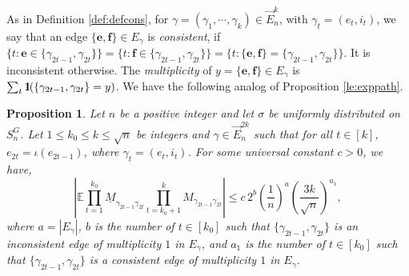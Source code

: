 \documentclass[11pt]{article}
\newtheorem{proposition}[lemma]{Proposition}
\newtheorem{definition}[lemma]{Definition}
\newcommand{\dE}{\mathbb {E}}
\newcommand{\cE}{E}
\newcommand{\ABS}[1]{{{\left| #1 \right|}}} %
\newcommand{\PAR}[1]{{{\left(#1\right)}}} %
\newcommand{\1}{1\!\!{\sf I}}\newcommand{\IND}{\1}
\newcommand{\Be}{\bm{e}}
\newcommand{\Bf}{\bm{f}}
\begin{document}
%
%
%
%


As in Definition \ref{def:defcons}, for $\gamma = ( \gamma_1, \cdots , \gamma_{k}) \in \vec E_n^{k}$, with $\gamma_t = (e_t, i_t)$, we say that  an edge $\{\Be, \Bf \}   \in \cE_\gamma$ is {\em consistent}, if $\{ t :   \Be \in \{ \gamma_{2 t -1}, \gamma_{2t} \} \} = \{ t :  \Bf \in \{ \gamma_{2t-1}, \gamma_{2t}\} \}  = \{ t :   \{ \Be , \Bf \} =  \{ \gamma_{2t-1}, \gamma_{2t}\}\}$.  It is inconsistent otherwise.  The {\em multiplicity} of $y = \{ \Be , \Bf \} \in \cE_\gamma$ is $\sum_t \IND ( \{\gamma_{2t-1} , \gamma_{2t} \}  = y )$. We have the following analog of Proposition \ref{le:exppath}.
\begin{proposition}
\label{leM:exppath}
Let  $n$ be a  positive integer and let $\sigma$ be uniformly distributed on $S^G_n$. Let $1 \leq k_0 \leq  k \leq \sqrt{n}$ be integers and $ \gamma \in \vec E_n^{2k}$ such that  for all $t \in [k]$,  $e_{2t} = \iota(e_{2t-1})$, where $\gamma_{t}  = (e_t , i_t)$.  For some universal constant $c >0$, we have, 
$$
\ABS{ \dE \prod_{t= 1} ^{k_0}  \underline M_{\gamma_{2t-1} \gamma_{2t}} \prod_{t= k_0+1} ^{k}  M_{\gamma_{2t-1} \gamma_{2t}}} \leq c \, 2^{b} \PAR{ \frac{1 }{ n }}^{a} \PAR{ \frac{  3k   }{ \sqrt{n} }}^{a_1}, 
$$ 
where $a = | E_\gamma |$,  $b$  is the number of  $t \in [k_0]$ such that $\{ \gamma_{2t-1}, \gamma_{2t}\}$ is an inconsistent edge of multiplicity $1$ in $\cE_\gamma$,  and $a_1$ is the number of  $t \in [k_0]$ such that $\{ \gamma_{2t-1}, \gamma_{2t}\}$ is a consistent edge of multiplicity $1$ in $\cE_\gamma$.\end{proposition}
\end{document}
